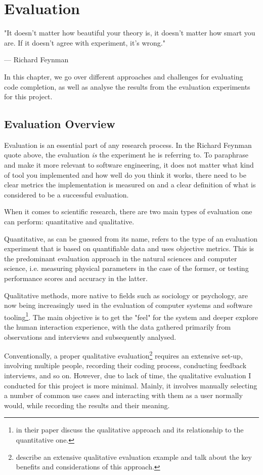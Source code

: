 \chapter{Evaluation}
\label{chap:Evaluation}

\epigraph{"It doesn't matter how beautiful your theory is, it doesn't matter how smart you are. If it doesn't agree with experiment, it's wrong."}{--- \textup{Richard Feynman}}

In this chapter, we go over different approaches and challenges for evaluating code completion, as well as analyse the results from the evaluation experiments for this project.

\section{Evaluation Overview}
\label{sec:Evaluation-Overview}
Evaluation is an essential part of any research process. In the Richard Feynman quote above, the evaluation \textit{is} the experiment he is referring to. To paraphrase and make it more relevant to software engineering, it does not matter what kind of tool you implemented and how well do you think it works, there need to be clear metrics the implementation is measured on and a clear definition of what is considered to be a successful evaluation.

When it comes to scientific research, there are two main types of evaluation one can perform: quantitative and qualitative.

Quantitative, as can be guessed from its name, refers to the type of an evaluation experiment that is based on quantifiable data and uses objective metrics. This is the predominant evaluation approach in the natural sciences and computer science, i.e. measuring physical parameters in the case of the former, or testing performance scores and accuracy in the latter.

Qualitative methods, more native to fields such as sociology or psychology, are now being increasingly used in the evaluation of computer systems and software tooling\footnote{\cite{Hazz06a} in their paper discuss the qualitative approach and its relationship to the quantitative one.}. The main objective is to get the "feel" for the system and deeper explore the human interaction experience, with the data gathered primarily from observations and interviews and subsequently analysed.

Conventionally, a proper qualitative evaluation\footnote{\cite{Kapl05a} describe an extensive qualitative evaluation example and talk about the key benefits and considerations of this approach.} requires an extensive set-up, involving multiple people, recording their coding process, conducting feedback interviews, and so on. However, due to lack of time, the qualitative evaluation I conducted for this project is more minimal. Mainly, it involves manually selecting a number of common use cases and interacting with them as a user normally would, while recording the results and their meaning.

